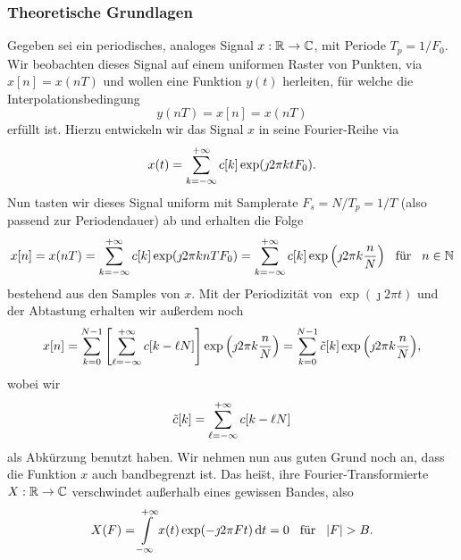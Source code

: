 %
%
\subsubsection{Theoretische Grundlagen}\label{sec:dftintp:theory}
%
Gegeben sei ein periodisches, analoges Signal $x: \mathbb{R} \rightarrow \mathbb{C}$, mit Periode $T_p = 1/F_0$. 
Wir beobachten dieses Signal auf einem uniformen Raster von Punkten, via $x[n] = x(n T)$ und wollen eine Funktion $y(t)$ herleiten, f\"ur welche die Interpolationsbedingung
\begin{equation}\label{eq:dftintp:eadf_interpol_cond}
    y(nT) = x[n] = x(nT)
\end{equation}
erf\"ullt ist. 
Hierzu entwickeln wir das Signal $x$ in seine Fourier-Reihe via
\begin{equation}\label{eq:dftintp:fourier_series}
    x(t) = {\sum\limits_{k=-\infty}^{+\infty}{
        c[k] \exp(\jmath 2 \pi k t F_0) 
    }}.
\end{equation}
Nun tasten wir dieses Signal uniform mit Samplerate $F_s = N/T_p = 1/T$ (also passend zur Periodendauer) ab und erhalten die Folge 
\begin{equation}
    x[n] = x(n T) = {\sum\limits_{k=-\infty}^{+\infty}{
        c[k] \exp(\jmath 2 \pi k n T F_0) 
    }} = {\sum\limits_{k=-\infty}^{+\infty}{
        c[k] \exp\left(\jmath 2 \pi k \frac nN\right) 
    }}
    {\hspace{3mm} \text{f\"ur} \hspace{3mm}}
    n \in \mathbb{N}
\end{equation}
bestehend aus den Samples von $x$. 
Mit der Periodizit\"at von $\exp(\jmath 2 \pi t)$ und der Abtastung erhalten wir au{\ss}erdem noch
\begin{equation}
    x[n] = {\sum\limits_{k=0}^{N-1}{
        \left[{\sum\limits_{\ell=-\infty}^{+\infty}{
            c[k - \ell N]
        }}\right] \exp\left(\jmath 2 \pi k \frac nN\right) 
    }} = {\sum\limits_{k=0}^{N-1}{
        \tilde{c}[k] \exp\left(\jmath 2 \pi k \frac nN\right) 
    }},
\end{equation}
wobei wir 
\begin{equation}\label{eq:dftintp:aliased_ck}
    \tilde{c}[k] = {\sum\limits_{\ell=-\infty}^{+\infty}{
        c[k - \ell N]
    }}
\end{equation}
als Abk\"urzung benutzt haben. 
Wir nehmen nun aus guten Grund noch an, dass die Funktion $x$ auch bandbegrenzt ist.
Das hei\"st, ihre Fourier-Transformierte $X : \mathbb{R} \rightarrow \mathbb{C}$ verschwindet au{\ss}erhalb eines gewissen Bandes, also
\begin{equation}
    X(F) = {\int\limits_{-\infty}^{+\infty}{x(t) \exp(-\jmath 2 \pi F t )}\,\mathrm{d}{t}} = 0 {\hspace{3mm} \text{f\"ur} \hspace{3mm}} {\left| F \right|} > B.
\end{equation}
